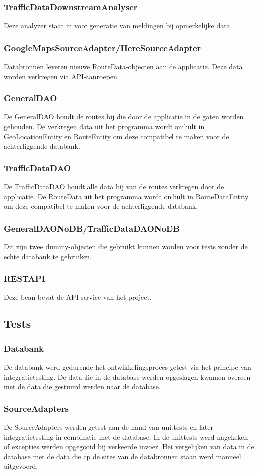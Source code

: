 \documentclass[ps,a4paper,oneside]{report}
\begin{document}
\subsubsection{TrafficDataDownstreamAnalyser}
Deze analyzer staat in voor generatie van meldingen bij opmerkelijke data.
\subsubsection{GoogleMapsSourceAdapter/HereSourceAdapter}
Databronnen leveren nieuwe RouteData-objecten aan de applicatie. Deze data worden verkregen via API-aanroepen.
\subsubsection{GeneralDAO}
De GeneralDAO houdt de routes bij die door de applicatie in de gaten worden gehouden. De verkregen data uit het programma wordt omhult in GeoLocationEntity en RouteEntity om deze compatibel te maken voor de achterliggende databank.
\subsubsection{TrafficDataDAO}
De TrafficDataDAO houdt alle data bij van de routes verkregen door de applicatie. De RouteData uit het programma wordt omhult in RouteDataEntity om deze compatibel te maken voor de achterliggende databank.
\subsubsection{GeneralDAONoDB/TrafficDataDAONoDB}
Dit zijn twee dummy-objecten die gebruikt kunnen worden voor tests zonder de echte databank te gebruiken.
\subsubsection{RESTAPI}
Deze bean bevat de API-service van het project.
\clearpage
\subsection{Tests}
\subsubsection{Databank}
De databank werd gedurende het ontwikkelingsproces getest via het principe van integratietesting. De data die in de database werden opgeslagen kwamen overeen met de data die gestuurd werden naar de database.
\subsubsection{SourceAdapters}
De SourceAdapters werden getest aan de hand van unittests en later integratietesting in combinatie met de database. In de unittests werd nagekeken of excepties werden opgegooid bij verkeerde invoer. Het vergelijken van data in de database met de data die op de sites van de databronnen staan werd manueel uitgevoerd.
\end{document}
